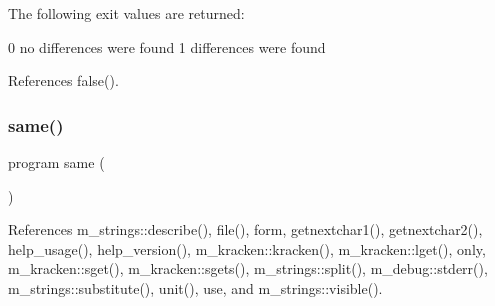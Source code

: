 The following exit values are returned\+:

0 no differences were found 1 differences were found 

References false().

\mbox{\label{__cmp_8f90_a099b4c5d750b7bb116895dc4fca1bf38}} 
\subsubsection{\texorpdfstring{same()}{same()}}
{\footnotesize\ttfamily program same (\begin{DoxyParamCaption}{ }\end{DoxyParamCaption})}



References m\+\_\+strings\+::describe(), file(), form, getnextchar1(), getnextchar2(), help\+\_\+usage(), help\+\_\+version(), m\+\_\+kracken\+::kracken(), m\+\_\+kracken\+::lget(), only, m\+\_\+kracken\+::sget(), m\+\_\+kracken\+::sgets(), m\+\_\+strings\+::split(), m\+\_\+debug\+::stderr(), m\+\_\+strings\+::substitute(), unit(), use, and m\+\_\+strings\+::visible().


